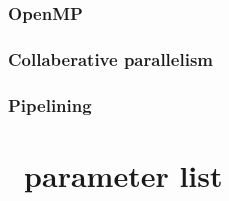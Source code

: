\documentclass{book}
\begin{document}
\subsection{OpenMP}

\subsection{Collaberative parallelism}

\subsection{Pipelining}



\appendix

\chapter{\enzo\ parameter list}
\end{document}
